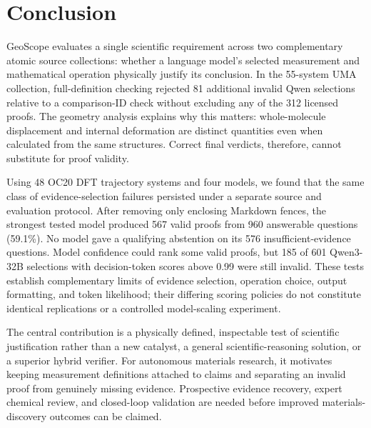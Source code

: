 \section{Conclusion}
\label{sec:conclusion}

GeoScope evaluates a single scientific requirement across two complementary atomic source collections: whether a language model's selected measurement and mathematical operation physically justify its conclusion. In the 55-system UMA collection, full-definition checking rejected 81 additional invalid Qwen selections relative to a comparison-ID check without excluding any of the 312 licensed proofs. The geometry analysis explains why this matters: whole-molecule displacement and internal deformation are distinct quantities even when calculated from the same structures. Correct final verdicts, therefore, cannot substitute for proof validity.

Using 48 OC20 DFT trajectory systems and four models, we found that the same class of evidence-selection failures persisted under a separate source and evaluation protocol. After removing only enclosing Markdown fences, the strongest tested model produced 567 valid proofs from 960 answerable questions (59.1\%). No model gave a qualifying abstention on its 576 insufficient-evidence questions. Model confidence could rank some valid proofs, but 185 of 601 Qwen3-32B selections with decision-token scores above 0.99 were still invalid. These tests establish complementary limits of evidence selection, operation choice, output formatting, and token likelihood; their differing scoring policies do not constitute identical replications or a controlled model-scaling experiment.

The central contribution is a physically defined, inspectable test of scientific justification rather than a new catalyst, a general scientific-reasoning solution, or a superior hybrid verifier. For autonomous materials research, it motivates keeping measurement definitions attached to claims and separating an invalid proof from genuinely missing evidence. Prospective evidence recovery, expert chemical review, and closed-loop validation are needed before improved materials-discovery outcomes can be claimed.
